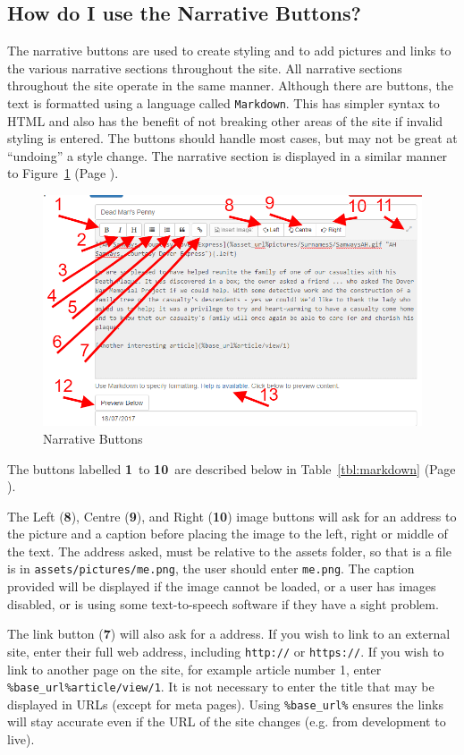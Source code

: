 \documentclass[12pt]{article}
\newcommand{\marker}[1]{\color{red}\textbf{#1}\color{black}}
\newcommand{\myref}[1]{\ref{#1} {\scriptsize(Page \pageref{#1})}}
\begin{document}
\newpage
\FloatBarrier
\subsection{How do I use the Narrative Buttons?}\label{ssec:narrative}
The narrative buttons are used to create styling and to add pictures and links to the various narrative sections throughout the site. All narrative sections throughout the site operate in the same manner. Although there are buttons, the text is formatted using a language called \texttt{Markdown}. This has simpler syntax to HTML and also has the benefit of not breaking other areas of the site if invalid styling is entered. The buttons should handle most cases, but may not be great at ``undoing'' a style change. The narrative section is displayed in a similar manner to Figure~\myref{fig:markdown}.

\begin{figure}[h]
  \centering
 \includegraphics[width=.9\textwidth]{pics/markdown.png}
	\caption{Narrative Buttons}\label{fig:markdown}
\end{figure}

The buttons labelled \marker{1}\ to \marker{10}\ are described below in Table~\myref{tbl:markdown}.

The Left (\marker{8}), Centre (\marker{9}), and Right (\marker{10}) image buttons will ask for an address to the picture and a caption before placing the image to the left, right or middle of the text. The address asked, must be relative to the assets folder, so that is a file is in \texttt{assets/pictures/me.png}, the user should enter \texttt{me.png}. The caption provided will be displayed if the image cannot be loaded, or a user has images disabled, or is using some text-to-speech software if they have a sight problem.

The link button (\marker{7}) will also ask for a address.
If you wish to link to an external site, enter their full web address, including \texttt{http://} or \texttt{https://}.
If you wish to link to another page on the site, for example article number 1, enter \texttt{\%base\_url\%article/view/1}. It is not necessary to enter the title that may be displayed in URLs (except for meta pages). Using \texttt{\%base\_url\%} ensures the links will stay accurate even if the URL of the site changes (e.g. from development to live).
\end{document}
